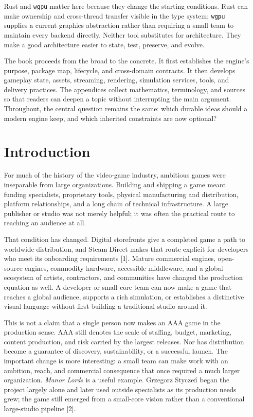 \documentclass[
  11pt,
  letterpaper,
  DIV=11,
  numbers=noendperiod,
  twoside,
  open=right]{scrreprt}
\begin{document}
Rust and \texttt{wgpu} matter here because they change the starting
conditions. Rust can make ownership and cross-thread transfer visible in
the type system; \texttt{wgpu} supplies a current graphics abstraction
rather than requiring a small team to maintain every backend directly.
Neither tool substitutes for architecture. They make a good architecture
easier to state, test, preserve, and evolve.

The book proceeds from the broad to the concrete. It first establishes
the engine's purpose, package map, lifecycle, and cross-domain
contracts. It then develops gameplay state, assets, streaming,
rendering, simulation services, tools, and delivery practices. The
appendices collect mathematics, terminology, and sources so that readers
can deepen a topic without interrupting the main argument. Throughout,
the central question remains the same: which durable ideas should a
modern engine keep, and which inherited constraints are now optional?


\chapter*{Introduction}\label{introduction}


For much of the history of the video-game industry, ambitious games were
inseparable from large organizations. Building and shipping a game meant
funding specialists, proprietary tools, physical manufacturing and
distribution, platform relationships, and a long chain of technical
infrastructure. A large publisher or studio was not merely helpful; it
was often the practical route to reaching an audience at all.

That condition has changed. Digital storefronts give a completed game a
path to worldwide distribution, and Steam Direct makes that route
explicit for developers who meet its onboarding requirements {[}1{]}.
Mature commercial engines, open-source engines, commodity hardware,
accessible middleware, and a global ecosystem of artists, contractors,
and communities have changed the production equation as well. A
developer or small core team can now make a game that reaches a global
audience, supports a rich simulation, or establishes a distinctive
visual language without first building a traditional studio around it.

This is not a claim that a single person now makes an AAA game in the
production sense. AAA still denotes the scale of staffing, budget,
marketing, content production, and risk carried by the largest releases.
Nor has distribution become a guarantee of discovery, sustainability, or
a successful launch. The important change is more interesting: a small
team can make work with an ambition, reach, and commercial consequence
that once required a much larger organization. \emph{Manor Lords} is a
useful example. Grzegorz Styczeń began the project largely alone and
later used outside specialists as its production needs grew; the game
still emerged from a small-core vision rather than a conventional
large-studio pipeline {[}2{]}.
\end{document}
